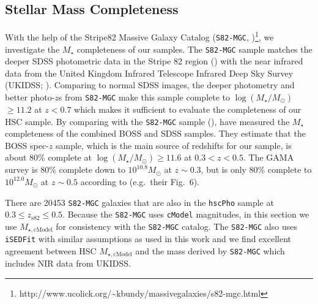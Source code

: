 \documentclass[a4paper,fleqn,usenatbib]{mnras}
\def\msun{$M_\odot$}
\def\etal{{\ et al.~}}
\def\ser{{S\'{e}rsic\ }}
\def\cmodel{\texttt{cModel}}
\def\mstar{{$M_{\star}$}}
\def\logms{{$\log (M_{\star}/M_{\odot})$}}
\def\mcmodel{{$M_{\star,\mathrm{cModel}}$}}
\begin{document}
        
   

\subsection{Stellar Mass Completeness}
    \label{ssec:complete}
    
    With the help of the Stripe82 Massive Galaxy Catalog (\texttt{S82-MGC},
    \citealt{Bundy2015}
    )\footnote{http://www.ucolick.org/\~{}kbundy/massivegalaxies/s82-mgc.html}, 
    we investigate the \mstar{} completeness of our samples. 
    The \texttt{S82-MGC} sample matches the deeper SDSS photometric data in the 
    Stripe 82 region (\citealt{Annis2014}) with the near infrared data from the United 
    Kingdom Infrared Telescope Infrared Deep Sky Survey (UKIDSS; 
    \citealt{Lawrence2007}). 
    Comparing to normal SDSS images, the deeper photometry and better photo-$z$s 
    from \texttt{S82-MGC} make this sample complete to \logms{}$\geq 11.2$ at $z<0.7$ 
    which makes it sufficient to evaluate the completeness of our HSC sample.   
	By comparing with the \texttt{S82-MGC} sample (\citealt{Bundy2015}), 
	\citet{Leauthaud2016} have measured the \mstar{} completeness of the combined BOSS 
	and SDSS samples. 
    They estimate that the BOSS spec-$z$ sample, which is the main source of redshifts 
    for our sample, is about 80\% complete at 
    \logms{}$\geq 11.6$ at $0.3 < z < 0.5$. The GAMA survey is 80\% complete down to 
    $10^{10.8}$\msun{} at $z{\sim} 0.3$, but is only 80\% complete to 
    $10^{12.0}$\msun{} at $z{\sim} 0.5$ according to \citet{Taylor2011} (e.g.\ 
    their Fig.~6).
    
    There are 20453 \texttt{S82-MGC} galaxies that are also in the \texttt{hscPho} 
    sample at $0.3 \leq z_{\mathrm{s82}} \leq 0.5$.  
    Because the \texttt{S82-MGC} uses \cmodel{} magnitudes, in this section we use  
    \mcmodel{} for consistency with the \texttt{S82-MGC} catalog.  
    The \texttt{S82-MGC} also uses \texttt{iSEDFit} with similar assumptions as 
    used in this work and we find excellent agreement between HSC \mcmodel{} and 
    the mass derived by \texttt{S82-MGC} which includes NIR data from UKIDSS.
    
\end{document}
